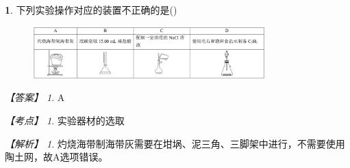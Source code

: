 \documentclass[UTF8, 10pt, a4paper, oneside]{ctexart}
\newcommand{\fs}[1]{{\fangsong #1}}%
\theoremstyle{definition}
\newtheorem{subexercise}{}[exercise]%
\theoremstyle{remark}
\newtheorem*{answer}{【答案】}
\newtheorem*{point}{【考点】}      %
\newtheorem*{explanation}{【解析】}     %
\theoremstyle{plain}
\begin{document}
\begin{subexercise}
    \fs{[2024·甘肃卷]}下列实验操作对应的装置不正确的是\quad(\quad)
    \begin{figure}[h]
        \centering
        \includegraphics[width=0.8\textwidth, keepaspectratio]{assists/12.3.1.jpg}
    \end{figure}
    \begin{answer}
        A
    \end{answer}
    \begin{point}
        实验器材的选取
    \end{point}
    \begin{explanation}
        灼烧海带制海带灰需要在坩埚、泥三角、三脚架中进行，不需要使用陶土网，故A选项错误。
    \end{explanation}
\end{subexercise}
\end{document}
